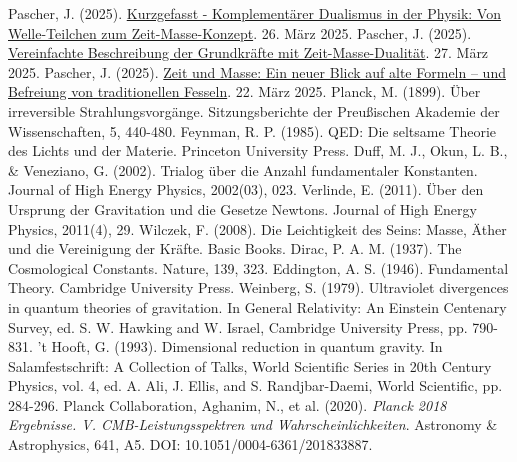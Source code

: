 \documentclass[12pt,a4paper]{article}
\begin{document}
\begin{thebibliography}{99}
		 Pascher, J. (2025). \href{https://github.com/jpascher/T0-Time-Mass-Duality/tree/main/2/pdf/Deutsch/Kurzgefasst\%20-\%20Komplementärer\%20Dualismus\%20in\%20der\%20Physik\%20-\%20Von\%20Welle-Teilchen\%20zum\%20Zeit-Masse-Konzept.pdf}{Kurzgefasst - Komplementärer Dualismus in der Physik: Von Welle-Teilchen zum Zeit-Masse-Konzept}. 26. März 2025.
		 Pascher, J. (2025). \href{https://github.com/jpascher/T0-Time-Mass-Duality/tree/main/2/pdf/Deutsch/Vereinfachte\%20Beschreibung\%20der\%20vier\%20Grundkräfte\%20mit\%20Zeit-Masse-Dualität.pdf}{Vereinfachte Beschreibung der Grundkräfte mit Zeit-Masse-Dualität}. 27. März 2025.
		 Pascher, J. (2025). \href{https://github.com/jpascher/T0-Time-Mass-Duality/tree/main/2/pdf/Deutsch/Zeit\%20und\%20Masse\%20Ein\%20neuer\%20Blick\%20auf\%20alte\%20Formeln\%20–\%20und\%20die\%20Befreiung\%20von\%20traditionellen\%20Fesseln.pdf}{Zeit und Masse: Ein neuer Blick auf alte Formeln – und Befreiung von traditionellen Fesseln}. 22. März 2025.
		 Planck, M. (1899). Über irreversible Strahlungsvorgänge. Sitzungsberichte der Preußischen Akademie der Wissenschaften, 5, 440-480.
		 Feynman, R. P. (1985). QED: Die seltsame Theorie des Lichts und der Materie. Princeton University Press.
		 Duff, M. J., Okun, L. B., \& Veneziano, G. (2002). Trialog über die Anzahl fundamentaler Konstanten. Journal of High Energy Physics, 2002(03), 023.
		 Verlinde, E. (2011). Über den Ursprung der Gravitation und die Gesetze Newtons. Journal of High Energy Physics, 2011(4), 29.
		 Wilczek, F. (2008). Die Leichtigkeit des Seins: Masse, Äther und die Vereinigung der Kräfte. Basic Books.
		 Dirac, P. A. M. (1937). The Cosmological Constants. Nature, 139, 323.
		 Eddington, A. S. (1946). Fundamental Theory. Cambridge University Press.
		 Weinberg, S. (1979). Ultraviolet divergences in quantum theories of gravitation. In General Relativity: An Einstein Centenary Survey, ed. S. W. Hawking and W. Israel, Cambridge University Press, pp. 790-831.
		 't Hooft, G. (1993). Dimensional reduction in quantum gravity. In Salamfestschrift: A Collection of Talks, World Scientific Series in 20th Century Physics, vol. 4, ed. A. Ali, J. Ellis, and S. Randjbar-Daemi, World Scientific, pp. 284-296.
		 Planck Collaboration, Aghanim, N., et al. (2020). \textit{Planck 2018 Ergebnisse. V. CMB-Leistungsspektren und Wahrscheinlichkeiten}. Astronomy \& Astrophysics, 641, A5. DOI: 10.1051/0004-6361/201833887.

\end{thebibliography}
\end{document}
